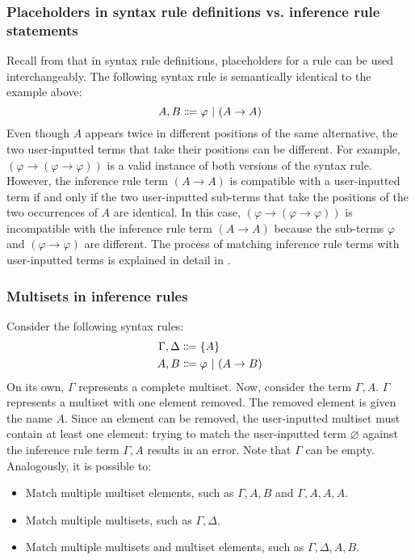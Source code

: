 \subsubsection{Placeholders in syntax rule definitions vs. inference rule statements}
Recall from  that in syntax rule definitions, placeholders for a rule can be used interchangeably. The following syntax rule is semantically identical to the example above:
\[
    A, B \Coloneqq \varphi \ |\  (A \to A)
\]
Even though $A$ appears twice in different positions of the same alternative, the two user-inputted terms that take their positions can be different. For example, $(\varphi \to (\varphi \to \varphi))$ is a valid instance of both versions of the syntax rule. However, the inference rule term $(A \to A)$ is compatible with a user-inputted term if and only if the two user-inputted sub-terms that take the positions of the two occurrences of $A$ are identical. In this case, $(\varphi \to (\varphi \to \varphi))$ is incompatible with the inference rule term $(A \to A)$ because the sub-terms $\varphi$ and $(\varphi \to \varphi)$ are different. The process of matching inference rule terms with user-inputted terms is explained in detail in .

\subsubsection{Multisets in inference rules}
\label{inference:multisets}
Consider the following syntax rules:
\begin{align*}
    \Gamma, \Delta &\Coloneqq \{ A \} \\
    A, B &\Coloneqq \varphi \ |\  (A \to B)
\end{align*}
On its own, $\Gamma$ represents a complete multiset. Now, consider the term $\Gamma, A$. $\Gamma$ represents a multiset with one element removed. The removed element is given the name $A$. Since an element can be removed, the user-inputted multiset must contain at least one element: trying to match the user-inputted term $\varnothing$ against the inference rule term $\Gamma, A$ results in an error. Note that $\Gamma$ can be empty. Analogously, it is possible to:
\begin{itemize}
    \item Match multiple multiset elements, such as $\Gamma, A, B$ and $\Gamma, A, A, A$.
    \item Match multiple multisets, such as $\Gamma, \Delta$.
    \item Match multiple multisets and multiset elements, such as $\Gamma, \Delta, A, B$.
\end{itemize}

